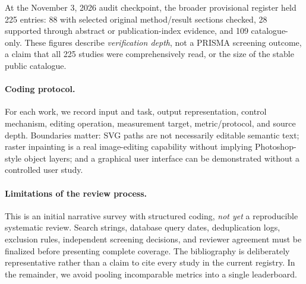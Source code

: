 At the November 3, 2026 audit checkpoint, the broader provisional register held 225 entries: 88 with selected original method/result sections checked, 28 supported through abstract or publication-index evidence, and 109 catalogue-only. These figures describe \emph{verification depth}, not a PRISMA screening outcome, a claim that all 225 studies were comprehensively read, or the size of the stable public catalogue.

\paragraph{Coding protocol.}
For each work, we record input and task, output representation, control mechanism, editing operation, measurement target, metric/protocol, and source depth. Boundaries matter: SVG paths are not necessarily editable semantic text; raster inpainting is a real image-editing capability without implying Photoshop-style object layers; and a graphical user interface can be demonstrated without a controlled user study.

\paragraph{Limitations of the review process.}
This is an initial narrative survey with structured coding, \emph{not yet} a reproducible systematic review. Search strings, database query dates, deduplication logs, exclusion rules, independent screening decisions, and reviewer agreement must be finalized before presenting complete coverage. The bibliography is deliberately representative rather than a claim to cite every study in the current registry. In the remainder, we avoid pooling incomparable metrics into a single leaderboard.
